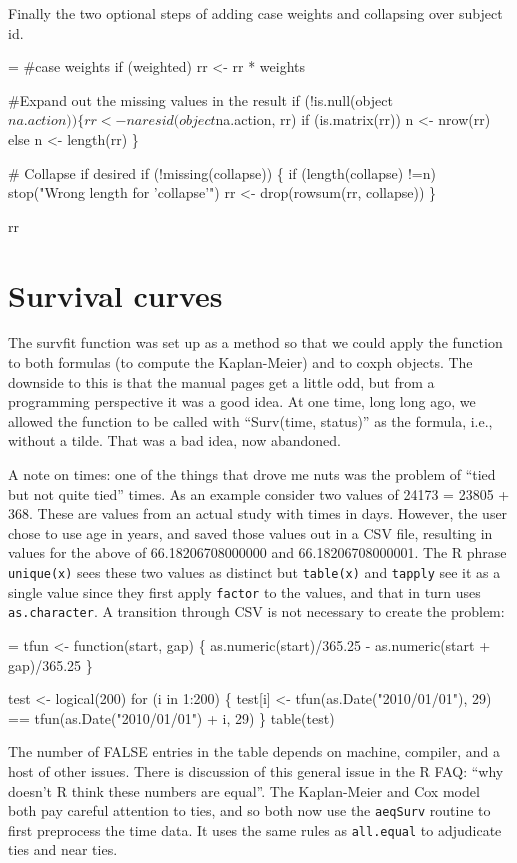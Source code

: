 \documentclass{article}
\newcommand{\code}[1]{\texttt{#1}}
\begin{document}
Finally the two optional steps of adding case weights and
collapsing over subject id.
\begin{nwchunk}
=
 #case weights
 if (weighted) rr <- rr * weights
 
 #Expand out the missing values in the result
 if (!is.null(object$na.action)) \{
     rr <- naresid(object$na.action, rr)
     if (is.matrix(rr)) n <- nrow(rr)
     else               n <- length(rr)
     \}
 
 # Collapse if desired
 if (!missing(collapse)) \{
     if (length(collapse) !=n) stop("Wrong length for 'collapse'")
     rr <- drop(rowsum(rr, collapse))
     \}
 
 rr
\end{nwchunk}
        







\section{Survival curves}
The survfit function was set up as a method so that we could apply the
function to both formulas (to compute the Kaplan-Meier) and to coxph
objects.
The downside to this is that the manual pages get a little odd, but from
a programming perspective it was a good idea.
At one time, long long ago, we allowed the function to be called with
``Surv(time, status)'' as the formula, i.e., without a tilde.  That was
a bad idea, now abandoned.

A note on times:  one of the things that drove me nuts was the problem of
``tied but not quite tied'' times.  
As an example consider two values of 24173 = 23805 + 368. These are values from
an actual study with times in days.
However, the user chose to use age in years, and saved those values out
in a CSV file, resulting in values for the above of 66.18206708000000 
and 66.18206708000001.
The R phrase \code{unique(x)} sees these two values as distinct but 
\code{table(x)} and \code{tapply} see it as a single value since they 
first apply \code{factor} to the values, and that in turn uses 
\code{as.character}.  
A transition through CSV is not necessary to create the problem:
\begin{nwchunk}
=
 tfun <- function(start, gap) \{
     as.numeric(start)/365.25 - as.numeric(start + gap)/365.25
 \}
 
 test <- logical(200)
 for (i in 1:200) \{
     test[i] <- tfun(as.Date("2010/01/01"), 29) == 
                tfun(as.Date("2010/01/01") + i, 29)
 \}
 table(test)
\end{nwchunk}
The number of FALSE entries in the table depends on machine, compiler,
and a host of other issues.
There is discussion of this general issue in the R FAQ: ``why doesn't R
think these numbers are equal''.
The Kaplan-Meier and Cox model both pay careful attention to ties, and
so both now use the \code{aeqSurv} routine to first preprocess
the time data.  It uses the same rules as \code{all.equal} to
adjudicate ties and near ties.
\end{document}
